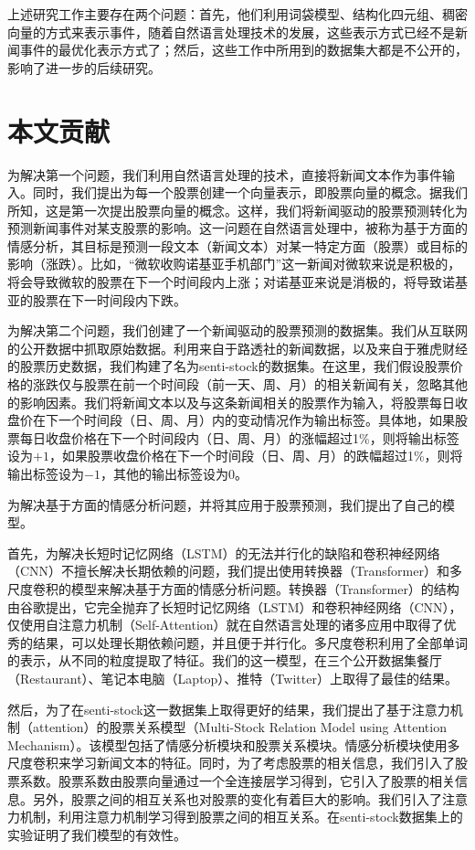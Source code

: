 上述研究工作主要存在两个问题：首先，他们利用词袋模型、结构化四元组、稠密向量的方式来表示事件，随着自然语言处理技术的发展，这些表示方式已经不是新闻事件的最优化表示方式了；然后，这些工作中所用到的数据集大都是不公开的，影响了进一步的后续研究。

\section{本文贡献}

为解决第一个问题，我们利用自然语言处理的技术，直接将新闻文本作为事件输入。同时，我们提出为每一个股票创建一个向量表示，即股票向量的概念。据我们所知，这是第一次提出股票向量的概念。这样，我们将新闻驱动的股票预测转化为预测新闻事件对某支股票的影响。这一问题在自然语言处理中，被称为基于方面的情感分析，其目标是预测一段文本（新闻文本）对某一特定方面（股票）或目标的影响（涨跌）。比如，“微软收购诺基亚手机部门”这一新闻对微软来说是积极的，将会导致微软的股票在下一个时间段内上涨；对诺基亚来说是消极的，将导致诺基亚的股票在下一时间段内下跌。

为解决第二个问题，我们创建了一个新闻驱动的股票预测的数据集。我们从互联网的公开数据中抓取原始数据。利用来自于路透社的新闻数据，以及来自于雅虎财经的股票历史数据，我们构建了名为senti-stock的数据集。在这里，我们假设股票价格的涨跌仅与股票在前一个时间段（前一天、周、月）的相关新闻有关，忽略其他的影响因素。我们将新闻文本以及与这条新闻相关的股票作为输入，将股票每日收盘价在下一个时间段（日、周、月）内的变动情况作为输出标签。具体地，如果股票每日收盘价格在下一个时间段内（日、周、月）的涨幅超过1\%，则将输出标签设为$+1$，如果股票收盘价格在下一个时间段（日、周、月）的跌幅超过1\%，则将输出标签设为$-1$，其他的输出标签设为$0$。

为解决基于方面的情感分析问题，并将其应用于股票预测，我们提出了自己的模型。

首先，为解决长短时记忆网络（LSTM）的无法并行化的缺陷和卷积神经网络（CNN）不擅长解决长期依赖的问题，我们提出使用转换器（Transformer）\cite{NIPS2017_7181}和多尺度卷积的模型来解决基于方面的情感分析问题。转换器（Transformer）的结构由谷歌提出，它完全抛弃了长短时记忆网络（LSTM）和卷积神经网络（CNN），仅使用自注意力机制（Self-Attention）就在自然语言处理的诸多应用中取得了优秀的结果，可以处理长期依赖问题，并且便于并行化。多尺度卷积利用了全部单词的表示，从不同的粒度提取了特征。我们的这一模型，在三个公开数据集餐厅（Restaurant）、笔记本电脑（Laptop）、推特（Twitter）上取得了最佳的结果。

然后，为了在senti-stock这一数据集上取得更好的结果，我们提出了基于注意力机制（attention）的股票关系模型（Multi-Stock Relation Model using Attention Mechanism）。该模型包括了情感分析模块和股票关系模块。情感分析模块使用多尺度卷积来学习新闻文本的特征。同时，为了考虑股票的相关信息，我们引入了股票系数。股票系数由股票向量通过一个全连接层学习得到，它引入了股票的相关信息。另外，股票之间的相互关系也对股票的变化有着巨大的影响。我们引入了注意力机制，利用注意力机制学习得到股票之间的相互关系。在senti-stock数据集上的实验证明了我们模型的有效性。

